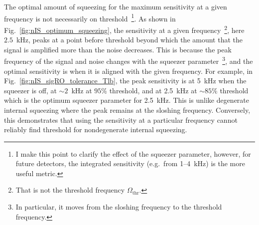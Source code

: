 
The optimal amount of squeezing for the maximum sensitivity at a given frequency is not necessarily on threshold~\footnote{I make this point to clarify the effect of the squeezer parameter, however, for future detectors, the integrated sensitivity (e.g.\ from 1--4~kHz) is the more useful metric.}. As shown in Fig.~\ref{fig:nIS_optimum_squeezing}, the sensitivity at a given frequency~\footnote{That is not the threshold frequency $\Omega_\text{thr}$.}, here $2.5$~kHz, peaks at a point before threshold beyond which the amount that the signal is amplified more than the noise decreases.
This is because the peak frequency of the signal and noise changes with the squeezer parameter~\footnote{In particular, it moves from the sloshing frequency to the threshold frequency.}, and the optimal sensitivity is when it is aligned with the given frequency. For example, in Fig.~\ref{fig:nIS_sigRO_tolerance_Tlb}, the peak sensitivity is at 5~kHz when the squeezer is off, at $\sim2$~kHz at $95\%$ threshold, and at 2.5~kHz at $\sim85\%$ threshold which is the optimum squeezer parameter for 2.5~kHz.
This is unlike degenerate internal squeezing where the peak remains at the sloshing frequency. %
Conversely, this demonstrates that using the sensitivity at a particular frequency cannot reliably find threshold for nondegenerate internal squeezing. %


